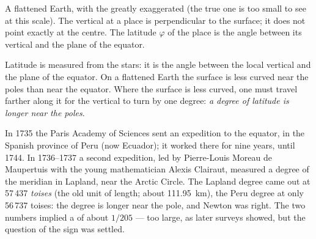 \begin{omfigure}

{\small A flattened Earth, with the  greatly exaggerated (the true
one is too small to see at this scale). The vertical at a place is
perpendicular to the surface; it does not point exactly at the centre. The
latitude $\varphi$ of the place is the angle between its vertical and the
plane of the equator.}
\end{omfigure}

Latitude is measured from the stars: it is the angle between the local
vertical and the plane of the equator. On a flattened Earth the surface is
less curved near the poles than near the equator. Where the surface is less
curved, one must travel farther along it for the vertical to turn by one
degree: \emph{a degree of latitude is longer near the poles}.

\begin{history}
In 1735 the Paris Academy of Sciences sent an expedition to the equator, in
the Spanish province of Peru (now Ecuador); it worked there for nine years,
until 1744. In 1736--1737 a second expedition, led by Pierre-Louis Moreau de
Maupertuis with the young mathematician Alexis Clairaut, measured a degree
of the meridian in Lapland, near the Arctic Circle. The Lapland degree came
out at 57\,437 \emph{toises} (the old unit of length; about
\qty{111.95}{km}), the Peru degree at only 56\,737 toises: the degree is
longer near the pole, and Newton was right. The two numbers implied a
 of about $1/205$ --- too large, as later surveys showed, but the
question of the sign was settled.
\end{history}

